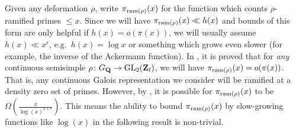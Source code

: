 Given any deformation $\rho$, write $\pi_{\mathrm{ram}(\rho)}(x)$ for the function 
which counts $\rho$-ramified primes $\leqslant x$. Since we will have 
$\pi_{\mathrm{ram}(\rho)}(x)\ll h(x)$ and bounds of this form are only helpful 
if $h(x) = o(\pi(x))$, we will usually assume $h(x) \ll x^\epsilon$, 
e.g.~$h(x) = \log x$ or something which grows even slower (for example, the 
inverse of the Ackermann function). In \cite{khare-rajan-2001}, it is proved 
that for \emph{any} continuous semisimple $\rho\colon G_{\mathbf{Q}} \to \operatorname{GL}_2(\mathbf{Z}_l)$, 
we will have $\pi_{\mathrm{ram}(\rho)}(x) = o(\pi(x))$. That is, any continuous 
Galois representation we consider will be ramified at a density zero set of 
primes. However, by \cite[Th.~19]{khare-larsen-ramakrishna-2005}, it is 
possible for $\pi_{\mathrm{ram}(\rho)}(x)$ to be 
$\Omega(\frac{x}{\log(x)^{1+\epsilon}})$. This means the ability to bound 
$\pi_{\mathrm{ram}(\rho)}(x)$ by slow-growing functions like $\log(x)$ in the 
following result is non-trivial. 

